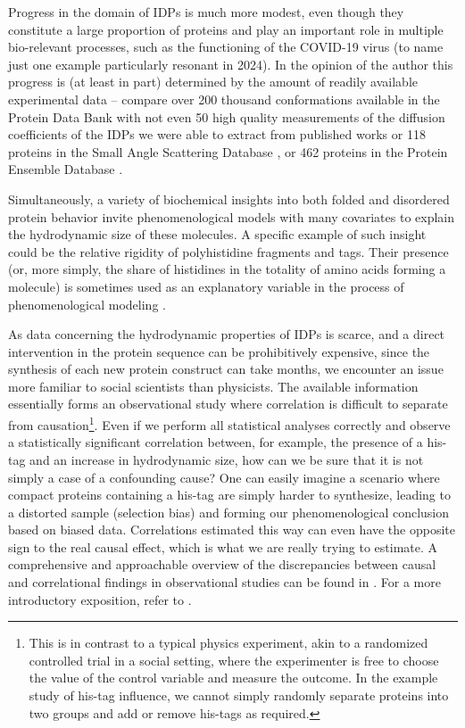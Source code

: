 \documentclass{doctoral}
\begin{document}
Progress in the domain of IDPs is much more modest, even though they constitute a large proportion of proteins \cite{Ward_2004} and play an important role in multiple bio-relevant processes, such as the functioning of the COVID-19 virus \cite{Rozycki_2022} (to name just one example particularly resonant in 2024).
In the opinion of the author this progress is (at least in part) determined by the amount of readily available experimental data -- compare over 200 thousand conformations available in the Protein Data Bank \cite{rcsb_org} with not even 50 high quality measurements of the diffusion coefficients of the IDPs we were able to extract from published works \cite{Waszkiewicz_2024_mda} or 118 proteins in the Small Angle Scattering Database \cite{sasdb_org}, or 462 proteins in the Protein Ensemble Database \cite{proteinensemble_org}.

Simultaneously, a variety of biochemical insights into both folded and disordered protein behavior invite phenomenological models with many covariates to explain the hydrodynamic size of these molecules.
A specific example of such insight could be the relative rigidity of polyhistidine fragments and tags.
Their presence (or, more simply, the share of histidines in the totality of amino acids forming a molecule) is sometimes used as an explanatory variable in the process of phenomenological modeling \cite{Tomasso_2016, Marsh_2010}.

As data concerning the hydrodynamic properties of IDPs is scarce, and a direct intervention in the protein sequence can be prohibitively expensive, since the synthesis of each new protein construct can take months, we encounter an issue more familiar to social scientists than physicists.
The available information essentially forms an observational study where correlation is difficult to separate from causation\footnote{This is in contrast to a typical physics experiment, akin to a randomized controlled trial in a social setting, where the experimenter is free to choose the value of the control variable and measure the outcome.
    In the example study of his-tag influence, we cannot simply randomly separate proteins into two groups and add or remove his-tags as required.
}.
Even if we perform all statistical analyses correctly and observe a statistically significant correlation between, for example, the presence of a his-tag and an increase in hydrodynamic size, how can we be sure that it is not simply a case of a confounding cause?
One can easily imagine a scenario where compact proteins containing a his-tag are simply harder to synthesize, leading to a distorted sample (selection bias) and forming our phenomenological conclusion based on biased data.
Correlations estimated this way can even have the opposite sign to the real causal effect, which is what we are really trying to estimate.
A comprehensive and approachable overview of the discrepancies between causal and correlational findings in observational studies can be found in \textcite{Cinelli_2022}.
For a more introductory exposition, refer to \textcite{Neal_2020}.
\end{document}
